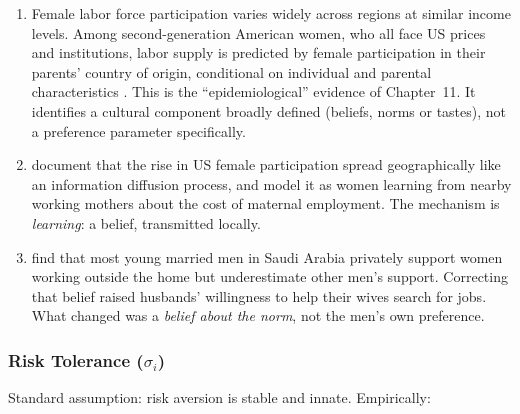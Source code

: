 \documentclass[../structural_economics_book.tex]{subfiles}
\begin{document}
\begin{stylizedfact}\label{ch09:prop:labor}
\leavevmode
\begin{enumerate}
\item Female labor force participation varies widely across regions at similar income levels. Among second-generation American women, who all face US prices and institutions, labor supply is predicted by female participation in their parents' country of origin, conditional on individual and parental characteristics \citep{fernandez2007women,fernandez2009culture}. This is the ``epidemiological'' evidence of Chapter~11. It identifies a cultural component broadly defined (beliefs, norms or tastes), not a preference parameter specifically.
\item \citet{fogli2011nature} document that the rise in US female participation spread geographically like an information diffusion process, and model it as women learning from nearby working mothers about the cost of maternal employment. The mechanism is \textit{learning}: a belief, transmitted locally.
\item \citet[\textit{AER}]{bursztyn2020misperceived} find that most young married men in Saudi Arabia privately support women working outside the home but underestimate other men's support. Correcting that belief raised husbands' willingness to help their wives search for jobs. What changed was a \textit{belief about the norm}, not the men's own preference.
\end{enumerate}
\end{stylizedfact}


\subsubsection{Risk Tolerance ($\sigma_i$)}

Standard assumption: risk aversion is stable and innate. Empirically:
\end{document}
